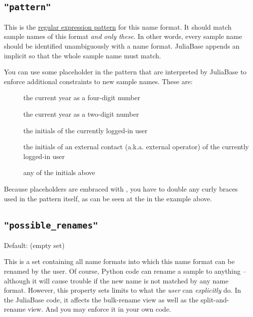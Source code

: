 \documentclass[a4paper,11pt,english]{sphinxmanual}
\begin{document}
\subsection{\texttt{"pattern"}}
\label{programming/sample_names:pattern}
This is the \href{https://docs.python.org/3.4/library/re.html\#regular-expression-syntax}{regular expression pattern} for
this name format.  It should match sample names of this format \emph{and only
these}.  In other words, every sample name should be identified unambiguously
with a name format.  JuliaBase appends an implicit  so that the whole
sample name must match.

You can use some placeholder in the pattern that are interpreted by JuliaBase
to enforce additional constraints to new sample names.  These are:
\begin{description}
\item[{}] \leavevmode
the current year as a four-digit number

\item[{}] \leavevmode
the current year as a two-digit number

\item[{}] \leavevmode
the initials of the currently logged-in user

\item[{}] \leavevmode
the initials of an external contact (a.k.a. external operator) of the
currently logged-in user

\item[{}] \leavevmode
any of the initials above

\end{description}

Because placeholders are embraced with , you have to double any curly
braces used in the pattern itself, as can be seen at the  in the
example above.


\subsection{\texttt{"possible\_renames"}}
\label{programming/sample_names:possible-renames}
Default:  (empty set)

This is a set containing all name formats into which this name format can be
renamed by the user.  Of course, Python code can rename a sample to anything --
although it will cause trouble if the new name is not matched by any name
format.  However, this property sets limits to what the \emph{user} can \emph{explicitly}
do.  In the JuliaBase code, it affects the bulk-rename view as well as the
split-and-rename view.  And you may enforce it in your own code.
\end{document}
